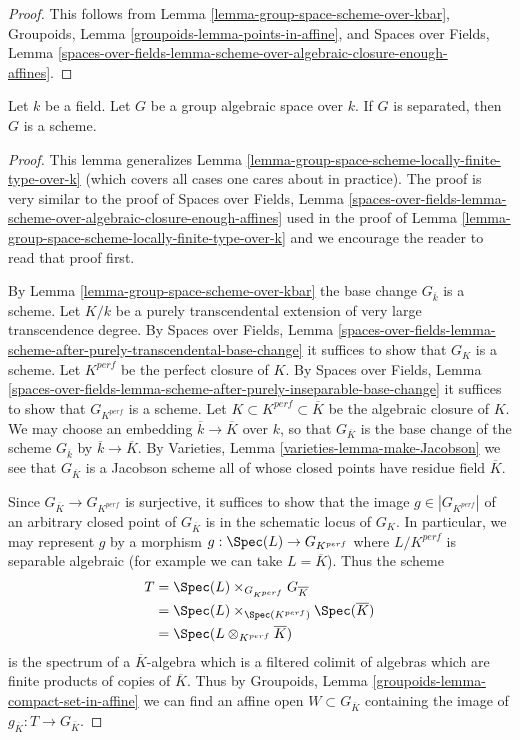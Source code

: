 \begin{proof}
This follows from
Lemma \ref{lemma-group-space-scheme-over-kbar},
Groupoids, Lemma \ref{groupoids-lemma-points-in-affine}, and
Spaces over Fields, Lemma
\ref{spaces-over-fields-lemma-scheme-over-algebraic-closure-enough-affines}.
\end{proof}

\begin{proposition}
\label{proposition-group-space-scheme-over-field}
Let $k$ be a field. Let $G$ be a group algebraic space over $k$.
If $G$ is separated, then $G$ is a scheme.
\end{proposition}

\begin{proof}
This lemma generalizes
Lemma \ref{lemma-group-space-scheme-locally-finite-type-over-k}
(which covers all cases one cares about in practice).
The proof is very similar to the proof of
Spaces over Fields, Lemma
\ref{spaces-over-fields-lemma-scheme-over-algebraic-closure-enough-affines}
used in the proof of
Lemma \ref{lemma-group-space-scheme-locally-finite-type-over-k}
and we encourage the reader to read that proof first.

\medskip\noindent
By Lemma \ref{lemma-group-space-scheme-over-kbar} the base
change $G_{\overline{k}}$ is a scheme.
Let $K/k$ be a purely transcendental extension of very large
transcendence degree. By Spaces over Fields, Lemma
\ref{spaces-over-fields-lemma-scheme-after-purely-transcendental-base-change}
it suffices to show that $G_K$ is a scheme.
Let $K^{perf}$ be the perfect closure of $K$. By
Spaces over Fields, Lemma
\ref{spaces-over-fields-lemma-scheme-after-purely-inseparable-base-change}
it suffices to show that $G_{K^{perf}}$ is a scheme.
Let $K \subset K^{perf} \subset \overline{K}$ be the algebraic closure
of $K$. We may choose an embedding $\overline{k} \to \overline{K}$ over
$k$, so that $G_{\overline{K}}$ is the base change of the scheme
$G_{\overline{k}}$ by $\overline{k} \to \overline{K}$. By
Varieties, Lemma \ref{varieties-lemma-make-Jacobson}
we see that $G_{\overline{K}}$ is a Jacobson scheme all of whose
closed points have residue field $\overline{K}$.

\medskip\noindent
Since $G_{\overline{K}} \to G_{K^{perf}}$ is surjective, it suffices to
show that the image $g \in |G_{K^{perf}}|$ of an arbitrary closed point of
$G_{\overline{K}}$ is in the schematic locus of $G_K$.
In particular, we may represent $g$ by a morphism
$g : \Spec(L) \to G_{K^{perf}}$ where $L/K^{perf}$ is separable algebraic
(for example we can take $L = \overline{K}$). Thus the scheme
\begin{align*}
T & = \Spec(L) \times_{G_{K^{perf}}} G_{\overline{K}} \\
& =
\Spec(L) \times_{\Spec(K^{perf})} \Spec(\overline{K}) \\
& =
\Spec(L \otimes_{K^{perf}} \overline{K})
\end{align*}
is the spectrum of a $\overline{K}$-algebra which is a filtered colimit
of algebras which are finite products of copies of $\overline{K}$.
Thus by Groupoids, Lemma \ref{groupoids-lemma-compact-set-in-affine}
we can find an affine open $W \subset G_{\overline{K}}$ containing
the image of $g_{\overline{K}} : T \to G_{\overline{K}}$.


\end{proof}
